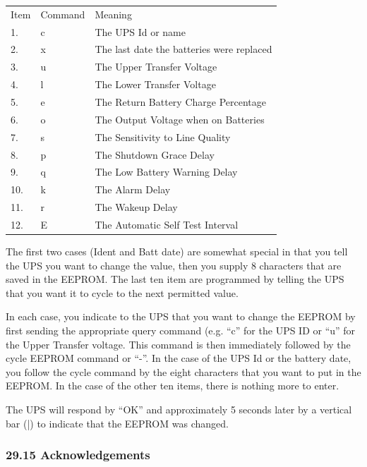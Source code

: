 \begin{longtable}{lll}
{Item} & {Command} & {Meaning 
 } \\
{1.} & {c} & {The UPS Id or name 
 } \\
{2.} & {x} & {The last date the batteries were replaced 
 } \\
{3.} & {u} & {The Upper Transfer Voltage 
 } \\
{4.} & {l} & {The Lower Transfer Voltage 
 } \\
{5.} & {e} & {The Return Battery Charge Percentage 
 } \\
{6.} & {o} & {The Output Voltage when on Batteries 
 } \\
{7.} & {s} & {The Sensitivity to Line Quality 
 } \\
{8.} & {p} & {The Shutdown Grace Delay 
 } \\
{9.} & {q} & {The Low Battery Warning Delay 
 } \\
{10.} & {k} & {The Alarm Delay 
 } \\
{11.} & {r} & {The Wakeup Delay 
 } \\
{12.} & {E} & {The Automatic Self Test Interval  
}

\end{longtable}

The first two cases (Ident and Batt date) are somewhat special in that you
tell the UPS you want to change the value, then you supply 8 characters that
are saved in the EEPROM. The last ten item are programmed by telling the UPS
that you want it to cycle to the next permitted value.  

In each case, you indicate to the UPS that you want to change the EEPROM by
first sending the appropriate query command (e.g. ``c'' for the UPS ID or
``u'' for the Upper Transfer voltage. This command is then immediately
followed by the cycle EEPROM command or ``-''. In the case of the UPS Id or
the battery date, you follow the cycle command by the eight characters that
you want to put in the EEPROM. In the case of the other ten items, there is
nothing more to enter.  

The UPS will respond by ``OK'' and approximately 5 seconds later by a vertical
bar (|) to indicate that the EEPROM was changed. 

\label{Acknowledgements}

\subsubsection*{29.15 Acknowledgements}

